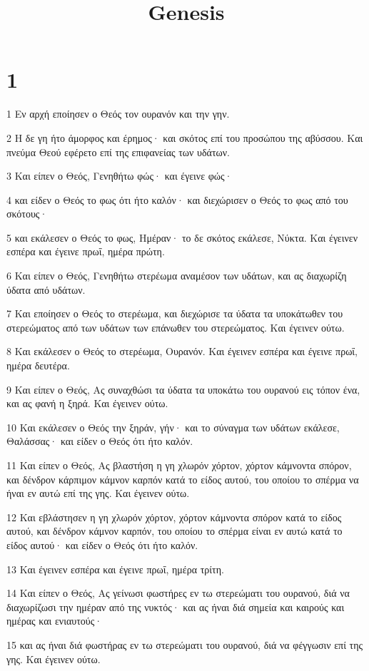 

\title{Genesis}


\chapter{1}

\par 1 Εν αρχή εποίησεν ο Θεός τον ουρανόν και την γην.
\par 2 Η δε γη ήτο άμορφος και έρημος· και σκότος επί του προσώπου της αβύσσου. Και πνεύμα Θεού εφέρετο επί της επιφανείας των υδάτων.
\par 3 Και είπεν ο Θεός, Γενηθήτω φώς· και έγεινε φώς·
\par 4 και είδεν ο Θεός το φως ότι ήτο καλόν· και διεχώρισεν ο Θεός το φως από του σκότους·
\par 5 και εκάλεσεν ο Θεός το φως, Ημέραν· το δε σκότος εκάλεσε, Νύκτα. Και έγεινεν εσπέρα και έγεινε πρωΐ, ημέρα πρώτη.
\par 6 Και είπεν ο Θεός, Γενηθήτω στερέωμα αναμέσον των υδάτων, και ας διαχωρίζη ύδατα από υδάτων.
\par 7 Και εποίησεν ο Θεός το στερέωμα, και διεχώρισε τα ύδατα τα υποκάτωθεν του στερεώματος από των υδάτων των επάνωθεν του στερεώματος. Και έγεινεν ούτω.
\par 8 Και εκάλεσεν ο Θεός το στερέωμα, Ουρανόν. Και έγεινεν εσπέρα και έγεινε πρωΐ, ημέρα δευτέρα.
\par 9 Και είπεν ο Θεός, Ας συναχθώσι τα ύδατα τα υποκάτω του ουρανού εις τόπον ένα, και ας φανή η ξηρά. Και έγεινεν ούτω.
\par 10 Και εκάλεσεν ο Θεός την ξηράν, γήν· και το σύναγμα των υδάτων εκάλεσε, Θαλάσσας· και είδεν ο Θεός ότι ήτο καλόν.
\par 11 Και είπεν ο Θεός, Ας βλαστήση η γη χλωρόν χόρτον, χόρτον κάμνοντα σπόρον, και δένδρον κάρπιμον κάμνον καρπόν κατά το είδος αυτού, του οποίου το σπέρμα να ήναι εν αυτώ επί της γης. Και έγεινεν ούτω.
\par 12 Και εβλάστησεν η γη χλωρόν χόρτον, χόρτον κάμνοντα σπόρον κατά το είδος αυτού, και δένδρον κάμνον καρπόν, του οποίου το σπέρμα είναι εν αυτώ κατά το είδος αυτού· και είδεν ο Θεός ότι ήτο καλόν.
\par 13 Και έγεινεν εσπέρα και έγεινε πρωΐ, ημέρα τρίτη.
\par 14 Και είπεν ο Θεός, Ας γείνωσι φωστήρες εν τω στερεώματι του ουρανού, διά να διαχωρίζωσι την ημέραν από της νυκτός· και ας ήναι διά σημεία και καιρούς και ημέρας και ενιαυτούς·
\par 15 και ας ήναι διά φωστήρας εν τω στερεώματι του ουρανού, διά να φέγγωσιν επί της γης. Και έγεινεν ούτω.
